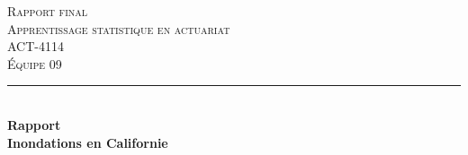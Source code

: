 %
%

\begin{titlepage}

\newcommand{\HRule}{\rule{\linewidth}{0.5mm}} %

\center %
\textsc{\LARGE Rapport final}\\[1.0cm] %
\textsc{\Large Apprentissage statistique en actuariat}\\[0.2cm] %
\textsc{\large ACT-4114}\\[0.7cm] %
\textsc{\large Équipe 09}\\[0.7cm] %


\HRule \\[0.4cm]
{ \Large \bfseries Rapport}\\[0.20cm] { \huge \bfseries Inondations en Californie}\\[0.20cm]


\end{titlepage}
